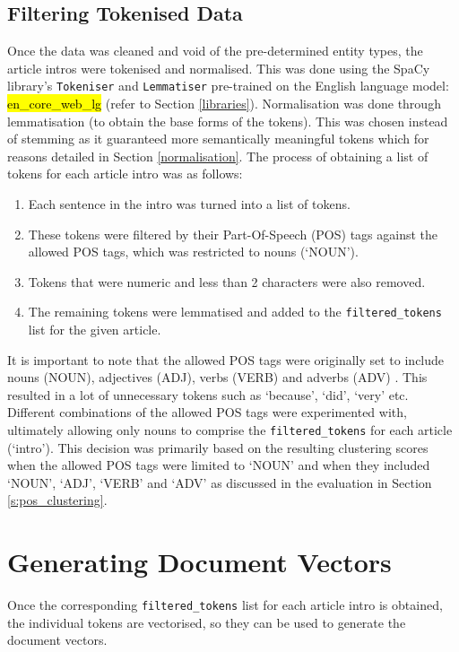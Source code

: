 \subsection{Filtering Tokenised Data} \label{filtered_tokens}
Once the data was cleaned and void of the pre-determined entity types, the article intros were tokenised and normalised. This was done using the SpaCy library's \texttt{Tokeniser} and \texttt{Lemmatiser} pre-trained on the English language model: \hl{en\_core\_web\_lg} (refer to Section \ref{libraries}). Normalisation was done through lemmatisation (to obtain the base forms of the tokens). This was chosen instead of stemming as it guaranteed more semantically meaningful tokens which for reasons detailed in Section \ref{normalisation}. The process of obtaining a list of tokens for each article intro was as follows:
\begin{enumerate}
    \item Each sentence in the intro was turned into a list of tokens.
    \item These tokens were filtered by their Part-Of-Speech (POS) tags against the allowed POS tags, which was restricted to nouns (`NOUN').
    \item Tokens that were numeric and less than 2 characters were also removed. 
    \item The remaining tokens were lemmatised and added to the \texttt{filtered\_tokens} list for the given article.
\end{enumerate}

It is important to note that the allowed POS tags were originally set to include nouns (NOUN), adjectives (ADJ), verbs (VERB) and adverbs (ADV) . This resulted in a lot of unnecessary tokens such as ‘because’, ‘did’, ‘very’ etc. Different combinations of the allowed POS tags were experimented with, ultimately allowing only nouns to comprise the \texttt{filtered\_tokens} for each article (`intro'). This decision was primarily based on the resulting clustering scores when the allowed POS tags were limited to `NOUN' and when they included `NOUN', `ADJ', `VERB' and `ADV' as discussed in the evaluation in Section \ref{s:pos_clustering}.

\section{Generating Document Vectors}

Once the corresponding \texttt{filtered\_tokens} list for each article intro is obtained, the individual tokens are vectorised, so they can be used to generate the document vectors.

